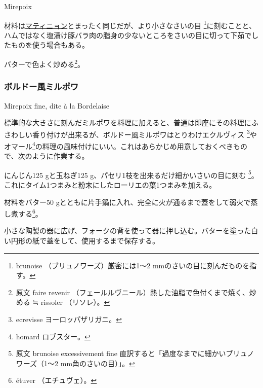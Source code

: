 \begin{recette}
\begin{frsubenv}

Mirepoix

\end{frsubenv}

 

材料は\protect\hyperlink{matignon}{マティニョン}とまったく同じだが、より小さなさいの目
\footnote{brunoise （ブリュノワーズ）厳密には1〜2
  mmのさいの目に刻んだものを指す。}に刻むことと、ハムではなく塩漬け豚バラ肉の脂身の少ないところをさいの目に切って下茹でしたものを使う場合もある。

バターで色よく炒める\footnote{原文 faire revenir
  （フェールルヴニール）熱した油脂で色付くまで焼く、炒める ≒ rissoler
  （リソレ）。}。

\atoaki{}

\hypertarget{mirepoix-fine}{%
\subsubsection{ボルドー風ミルポワ}\label{mirepoix-fine}}

\begin{frsubenv}

Mirepoix fine, dite à la Bordelaise

\end{frsubenv}


標準的な大きさに刻んだミルポワを料理に加えると、普通は即座にその料理にふさわしい香り付けが出来るが、ボルドー風ミルポワはとりわけエクルヴィス
\footnote{ecrevisse ヨーロッパザリガニ。}やオマール\footnote{homard
  ロブスター。}の料理の風味付けにいい。これはあらかじめ用意しておくべきもので、次のように作業する。

にんじん125 gと玉ねぎ125 g、パセリ1枝を出来るだけ細かいさいの目に刻む
\footnote{原文 brunoise excessivement fine
  直訳すると「過度なまでに細かいブリュノワーズ（1〜2
  mm角のさいの目）」。}。これにタイム1つまみと粉末にしたローリエの葉1つまみを加える。

材料をバター50
gとともに片手鍋に入れ、完全に火が通るまで蓋をして弱火で蒸し煮する\footnote{étuver
  （エチュヴェ）。}。

小さな陶製の器に広げ、フォークの背を使って器に押し込む。バターを塗った白い円形の紙で蓋をして、使用するまで保存する。


\end{recette}
